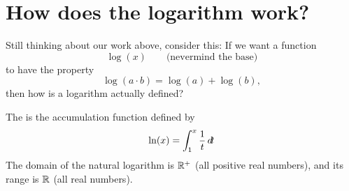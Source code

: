 \documentclass{ximera}
\begin{document}
\section{How does the logarithm work?}

Still thinking about our work above, consider this: If we want a function
\[
\log(x)\qquad\text{(nevermind the base)}
\]
to have the property
\[
\log(a\cdot b) = \log(a) + \log(b),
\]
then how is a logarithm actually defined?

\begin{definition}
  The  is the accumulation function defined by
  \[
  \ln(x) = \int_1^x \frac{1}{t} \mathop{}\!d\! t
  \]
  The domain of the natural logarithm is $\mathbb R^+$ (all positive real numbers),
  and its range is $\mathbb R$ (all real numbers). 
\end{definition}



\end{document}
